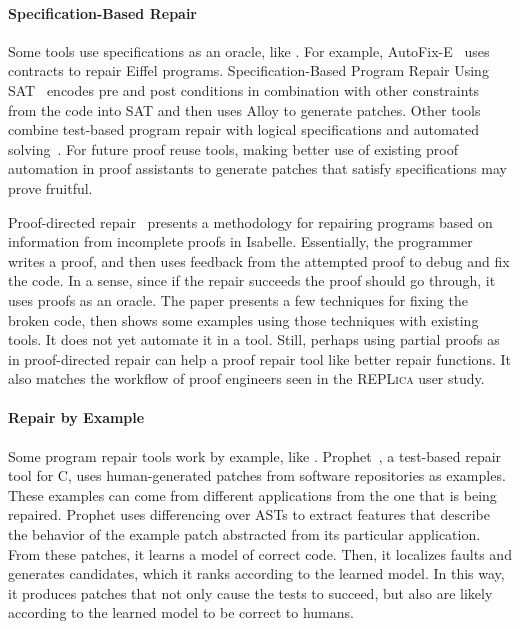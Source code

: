 \paragraph{Specification-Based Repair}
Some tools use specifications as an oracle, like \sysnamelong.
For example, AutoFix-E~\cite{Wei:2010:AFP:1831708.1831716, pei2014automated} uses contracts to repair Eiffel programs. 
Specification-Based Program Repair Using SAT~\cite{gopinath2011specification}
encodes pre and post conditions in combination with other constraints from the code 
into SAT and then uses Alloy to generate patches.
Other tools combine test-based program repair with logical specifications and automated solving~\cite{10.1007/978-3-540-24721-0_20, nguyen2013semfix, nguyen2013semfix, Xuan:2017:NAR:3071893.3071964, Mechtaev:2015:DLS:2818754.2818811, Ke:2015:RPS:2916135.2916260}.
For future proof reuse tools, making better use of existing proof automation in proof assistants to generate
patches that satisfy specifications may prove fruitful.

Proof-directed repair~\cite{dennis2006proof} presents a methodology
for repairing programs based on information from incomplete proofs in Isabelle.
Essentially, the programmer writes a proof, and then uses feedback
from the attempted proof to debug and fix the code.
In a sense, since if the repair succeeds the proof should go through,
it uses proofs as an oracle. The paper presents a few techniques for fixing the broken code,
then shows some examples using those techniques with existing tools.
It does not yet automate it in a tool.
Still, perhaps using partial proofs as in proof-directed repair can help a proof repair tool like \sysnamelong
better repair functions.
It also matches the workflow of proof engineers seen in the \textsc{REPLica} user study. %

\paragraph{Repair by Example}
Some program repair tools work by example, like \sysnamelong.
Prophet~\cite{Long:2016:APG:2837614.2837617}, a test-based repair tool for C,
uses human-generated patches from software repositories as examples.
These examples can come from different applications from the one that is being repaired.
Prophet uses differencing over ASTs %
to extract features that describe the behavior of the example patch abstracted from its particular application.
From these patches, it learns a model of correct code. Then,
it localizes faults and generates candidates, which it ranks according to the learned model.
In this way, it produces patches that not only cause the tests to succeed, but also
are likely according to the learned model to be correct to humans.


